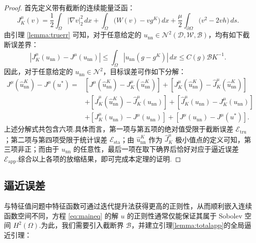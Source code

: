 \begin{proof}
首先定义带有截断的连续能量泛函：
\begin{equation*}
J_{K}^{\mu}(v)=\frac{1}{2}\int_{\Omega} |\nabla v|_{2}^{2} \,dx + \int_{\Omega} \big(W(v) - v g^K\big)\,dx + \frac{\mu}{2} \int_{\partial \Omega} \big(v^{2}-2 v h\big)\,ds.
\end{equation*}
由引理 \ref{lemma:truerr} 可知，对于任意给定的 $u_{\text{nn}}\in \mathcal{N}^{2}(\mathcal{D},\mathcal{W},\mathcal{B})$，均有如下截断误差界：
\begin{equation*}
|J_{K}^{\mu}(u_{\text{nn}})-J^{\mu}(u_{\text{nn}})|\leq\int_{\Omega}|u_{\text{nn}}(g-g^K)|\,dx\leq C(g)\mathcal{B}K^{-1}.
\end{equation*}
因此，对于任意给定的 $u_{\text{nn}}\in \mathcal{N}^{2}$，目标误差可作如下分解：
\begin{equation*}
\begin{aligned}
J^{\mu}\left(\widehat{u}_{\text{nn}}^{K}\right)-J^{\mu}(u^{*}) = &\left[J^{\mu}\left(\widehat{u}_{\text{nn}}^{K}\right)-J_{K}^{\mu}\left(\widehat{u}_{\text{nn}}^{K}\right)\right]+\left[J_{K}^{\mu}\left(\widehat{u}_{\text{nn}}^{K}\right)-\widehat{J}_{K}^{\mu}\left(\widehat{u}_{\text{nn}}^{K}\right)\right]\\
&+\left[\widehat{J}_{K}^{\mu}\left(\widehat{u}_{\text{nn}}^{K}\right)-\widehat{J}_{K}^{\mu}\left(u_{\text{nn}}\right)\right]+\left[\widehat{J}_{K}^{\mu}\left(u_{\text{nn}}\right)-J_{K}^{\mu}\left(u_{\text{nn}}\right)\right]\\
&+\left[J_{K}^{\mu}\left(u_{\text{nn}}\right)-J^{\mu}\left(u_{\text{nn}}\right)\right]+\left[J^{\mu}\left(u_{\text{nn}}\right)-J^{\mu}(u^{*})\right].
\end{aligned}
\end{equation*}
上述分解式共包含六项.具体而言，第一项与第五项的绝对值受限于截断误差 $\mathcal{E}_{\text{tru}}$；第二项与第四项受限于统计误差 $\mathcal{E}_{\text{sta}}$；由 $\widehat{u}^{K}_{\text{nn}}$ 作为 $\widehat{J}_{K}^{\mu}$ 极小值点的定义可知，第三项非正；而由于 $u_{\text{nn}}$ 的任意性，最后一项在取下确界后恰好对应于逼近误差 $\mathcal{E}_{\text{app}}$.综合以上各项的放缩结果，即可完成本定理的证明.
\end{proof}


\subsection{逼近误差}\label{sec:apperr}
与特征值问题中特征函数可通过迭代提升法获得更高的正则性，从而顺利嵌入连续函数空间不同，方程 \eqref{eq:maineq} 的解 $u$ 的正则性通常仅能保证其属于 Sobolev 空间 $H^2(\Omega)$.为此，我们需要引入截断界 $\mathcal{B}$，并建立引理\ref{lemma:totalapp}的全局逼近引理\cite{guhring2020error,siegel2022high}：

